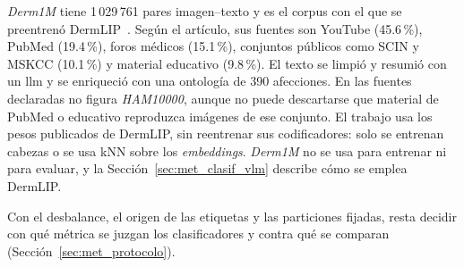 \emph{Derm1M} tiene 1\,029\,761 pares imagen--texto y es el corpus con el que se preentrenó DermLIP~\cite{yan2025derm1miccv}.
Según el artículo, sus fuentes son YouTube (45.6\,\%), PubMed (19.4\,\%), foros médicos (15.1\,\%), conjuntos públicos
como SCIN y MSKCC (10.1\,\%) y material educativo (9.8\,\%). El texto se limpió y resumió con un \gls{llm} y se enriqueció
con una ontología de 390 afecciones. En las fuentes declaradas no figura \emph{HAM10000}, aunque no puede descartarse
que material de PubMed o educativo reproduzca imágenes de ese conjunto. El trabajo usa los pesos publicados de DermLIP,
sin reentrenar sus codificadores: solo se entrenan cabezas o se usa kNN sobre los \emph{embeddings}. \emph{Derm1M} no se usa para
entrenar ni para evaluar, y la Sección~\ref{sec:met_clasif_vlm} describe cómo se emplea DermLIP.

Con el desbalance, el origen de las etiquetas y las particiones fijadas, resta decidir con qué métrica se juzgan los
clasificadores y contra qué se comparan (Sección~\ref{sec:met_protocolo}).
